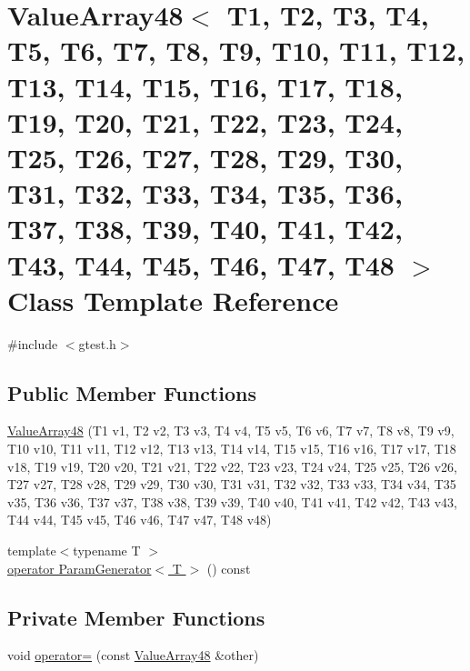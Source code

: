 \hypertarget{classtesting_1_1internal_1_1ValueArray48}{\section{\-Value\-Array48$<$ \-T1, \-T2, \-T3, \-T4, \-T5, \-T6, \-T7, \-T8, \-T9, \-T10, \-T11, \-T12, \-T13, \-T14, \-T15, \-T16, \-T17, \-T18, \-T19, \-T20, \-T21, \-T22, \-T23, \-T24, \-T25, \-T26, \-T27, \-T28, \-T29, \-T30, \-T31, \-T32, \-T33, \-T34, \-T35, \-T36, \-T37, \-T38, \-T39, \-T40, \-T41, \-T42, \-T43, \-T44, \-T45, \-T46, \-T47, \-T48 $>$ \-Class \-Template \-Reference}
\label{d5/d2c/classtesting_1_1internal_1_1ValueArray48}
}


{\ttfamily \#include $<$gtest.\-h$>$}

\subsection*{\-Public \-Member \-Functions}
\begin{DoxyCompactItemize}
\item 
\hyperlink{classtesting_1_1internal_1_1ValueArray48_a65c312eadab7960060bff7f65aae14a5}{\-Value\-Array48} (\-T1 v1, \-T2 v2, \-T3 v3, \-T4 v4, \-T5 v5, \-T6 v6, \-T7 v7, \-T8 v8, \-T9 v9, \-T10 v10, \-T11 v11, \-T12 v12, \-T13 v13, \-T14 v14, \-T15 v15, \-T16 v16, \-T17 v17, \-T18 v18, \-T19 v19, \-T20 v20, \-T21 v21, \-T22 v22, \-T23 v23, \-T24 v24, \-T25 v25, \-T26 v26, \-T27 v27, \-T28 v28, \-T29 v29, \-T30 v30, \-T31 v31, \-T32 v32, \-T33 v33, \-T34 v34, \-T35 v35, \-T36 v36, \-T37 v37, \-T38 v38, \-T39 v39, \-T40 v40, \-T41 v41, \-T42 v42, \-T43 v43, \-T44 v44, \-T45 v45, \-T46 v46, \-T47 v47, \-T48 v48)
\item 
{\footnotesize template$<$typename T $>$ }\\\hyperlink{classtesting_1_1internal_1_1ValueArray48_a08ef46fa12c9dd8ef6fc630baeea89b7}{operator Param\-Generator$<$ T $>$} () const 
\end{DoxyCompactItemize}
\subsection*{\-Private \-Member \-Functions}
\begin{DoxyCompactItemize}
\item 
void \hyperlink{classtesting_1_1internal_1_1ValueArray48_a4bc40bc0ad07b69f05cf78092680f8b5}{operator=} (const \hyperlink{classtesting_1_1internal_1_1ValueArray48}{\-Value\-Array48} \&other)
\end{DoxyCompactItemize}
